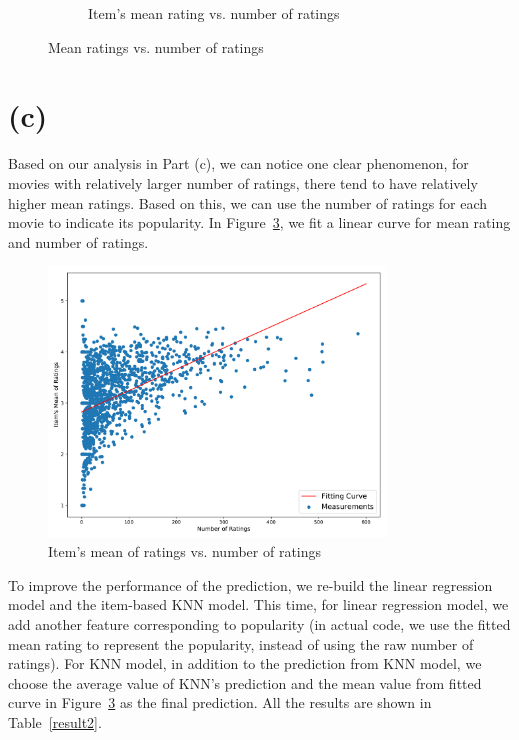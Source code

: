 \begin{figure}[!h]
\begin{subfigure}[b]{0.5\linewidth}
  \caption{Item's mean rating vs. number of ratings}
  \label{ex_with_source}
\end{subfigure}%
\raggedright
\caption{Mean ratings vs. number of ratings}
\label{fig:source_injection2}
\end{figure}

\section*{(c)}
Based on our analysis in Part (c), we can notice one clear phenomenon, for movies with relatively larger number of ratings, there tend to have relatively higher mean ratings. Based on this, we can use the number of ratings for each movie to indicate its popularity. In Figure~\ref{fig:fitted}, we fit a linear curve for mean rating and number of ratings.

\begin{figure}[htbp]
\centering
\includegraphics[width=0.8\textwidth]{./figures/fitting_curve.pdf}
\caption{Item's mean of ratings vs. number of ratings}
\label{fig:fitted} 
\end{figure}

To improve the performance of the prediction, we re-build the linear regression model and the item-based KNN model. This time, for linear regression model, we add another feature corresponding to popularity (in actual code, we use the fitted mean rating to represent the popularity, instead of using the raw number of ratings). For KNN model, in addition to the prediction from KNN model, we choose the average value of KNN's prediction and the mean value from fitted curve in Figure~\ref{fig:fitted} as the final prediction. All the results are shown in Table~\ref{result2}.


